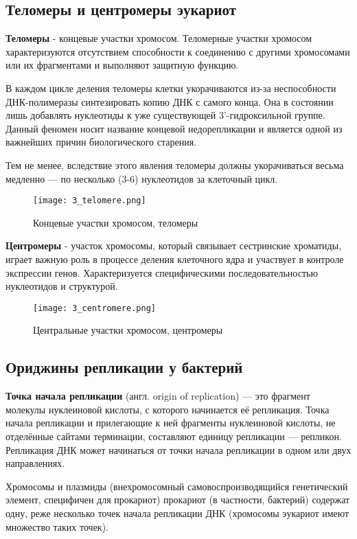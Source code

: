 \subsection{Теломеры и центромеры эукариот}
\textbf{Теломеры} - концевые участки хромосом. Теломерные участки хромосом характеризуются отсутствием способности к соединению с другими хромосомами или их фрагментами и выполняют защитную функцию. 

В каждом цикле деления теломеры клетки укорачиваются из-за неспособности ДНК-полимеразы синтезировать копию ДНК с самого конца. Она в состоянии лишь добавлять нуклеотиды к уже существующей 3’-гидроксильной группе. Данный феномен носит название концевой недорепликации и является одной из важнейших причин биологического старения.

Тем не менее, вследствие этого явления теломеры должны укорачиваться весьма медленно — по несколько (3-6) нуклеотидов за клеточный цикл.

\begin{figure}[h!]
    \centering
    \texttt{[image: 3\_telomere.png]}
    \caption{Концевые участки хромосом, теломеры}
    \label{fig:3_telomere}
\end{figure}

\textbf{Центромеры} - участок хромосомы, который связывает сестринские хроматиды, играет важную роль в процессе деления клеточного ядра и участвует в контроле экспрессии генов. Характеризуется специфическими последовательностью нуклеотидов и структурой.

\begin{figure}[h!]
    \centering
    \texttt{[image: 3\_centromere.png]}
    \caption{Центральные участки хромосом, центромеры}
    \label{fig:3_centromere}
\end{figure}

\subsection{Ориджины репликации у бактерий}
\textbf{Точка начала репликации} (англ. origin of replication) — это фрагмент молекулы нуклеиновой кислоты, с которого начинается её репликация. Точка начала репликации и прилегающие к ней фрагменты нуклеиновой кислоты, не отделённые сайтами терминации, составляют единицу репликации — репликон. Репликация ДНК может начинаться от точки начала репликации в одном или двух направлениях.

Хромосомы и плазмиды (внехромосомный самовоспроизводящийся генетический элемент, специфичен для прокариот) прокариот (в частности, бактерий) содержат одну, реже несколько точек начала репликации ДНК (хромосомы эукариот имеют множество таких точек).

